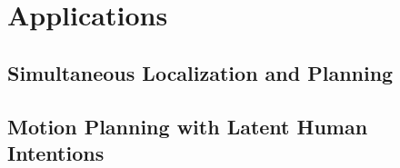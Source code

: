 \chapter{Applications}

\section{Simultaneous Localization and Planning}

\section{Motion Planning with Latent Human Intentions}
